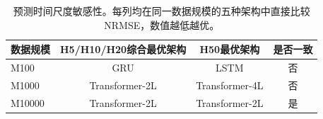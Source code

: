 
\begin{table}[H]
\centering
\caption{预测时间尺度敏感性。每列均在同一数据规模的五种架构中直接比较 NRMSE，数值越低越优。}
\label{tab:horizon_sensitivity}
\small
\begin{tabular}{lccc}
\toprule
数据规模 & H5/H10/H20综合最优架构 & H50最优架构 & 是否一致 \\
\midrule
M100 & GRU & LSTM & 否 \\
M1000 & Transformer-2L & Transformer-4L & 否 \\
M10000 & Transformer-2L & Transformer-2L & 是 \\
\bottomrule
\end{tabular}
\end{table}
